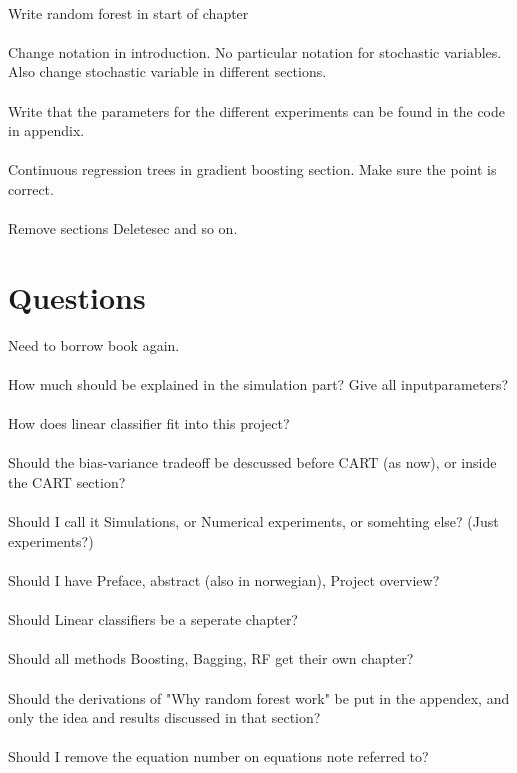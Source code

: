 \\
Write random forest in start of chapter\\
\\
Change notation in introduction. No particular notation for stochastic variables. Also change stochastic variable in different sections.\\
\\
Write that the parameters for the different experiments can be found in the code in appendix.\\
\\
Continuous regression trees in gradient boosting section. Make sure the point is correct.\\
\\
Remove sections Deletesec and so on.

\section{Questions}
\label{sec:Questions}
Need to borrow book again. \\
\\
How much should be explained in the simulation part? Give all inputparameters?\\
\\
How does linear classifier fit into this project?\\
\\
Should the bias-variance tradeoff be descussed before CART (as now), or inside the CART section?\\
\\
Should I call it Simulations, or Numerical experiments, or somehting else? (Just experiments?)\\
\\
Should I have Preface, abstract (also in norwegian), Project overview?\\
\\
Should Linear classifiers be a seperate chapter? \\
\\
Should all methods Boosting, Bagging, RF get their own chapter?\\
\\
Should the derivations of "Why random forest work" be put in the appendex, and only the idea and results discussed in that section?\\
\\
Should I remove the equation number on equations note referred to?\\
\\
